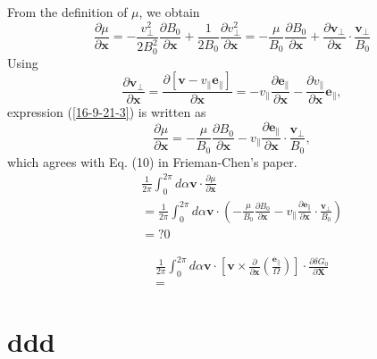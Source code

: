 \documentclass{llncs}
\newcommand{\tmmathbf}[1]{\ensuremath{\boldsymbol{#1}}}
\begin{document}
From the definition of $\mu$, we obtain
\begin{equation}
  \label{16-9-21-3} \frac{\partial \mu}{\partial \mathbf{x}} = -
  \frac{v_{\perp}^2}{2 B^2_0} \frac{\partial B_0}{\partial \mathbf{x}} +
  \frac{1}{2 B_0}  \frac{\partial v_{\perp}^2}{\partial \mathbf{x}} = -
  \frac{\mu}{B_0}  \frac{\partial B_0}{\partial \mathbf{x}} + \frac{\partial
  \mathbf{v}_{\perp}}{\partial \mathbf{x}} \cdot
  \frac{\mathbf{v}_{\perp}}{B_0}
\end{equation}
Using
\begin{equation}
  \frac{\partial \mathbf{v}_{\perp}}{\partial \mathbf{x}} = \frac{\partial
  [\mathbf{v}- v_{\parallel} \mathbf{e}_{\parallel}]}{\partial \mathbf{x}} = -
  v_{\parallel} \frac{\partial \mathbf{e}_{\parallel}}{\partial \mathbf{x}} -
  \frac{\partial v_{\parallel}}{\partial \mathbf{x}} \mathbf{e}_{\parallel},
\end{equation}
expression (\ref{16-9-21-3}) is written as
\begin{equation}
  \frac{\partial \mu}{\partial \mathbf{x}} = - \frac{\mu}{B_0}  \frac{\partial
  B_0}{\partial \mathbf{x}} - v_{\parallel} \frac{\partial
  \mathbf{e}_{\parallel}}{\partial \mathbf{x}} \cdot
  \frac{\mathbf{v}_{\perp}}{B_0},
\end{equation}
which agrees with Eq. (10) in Frieman-Chen's paper{\cite{frieman1982}}.
\begin{eqnarray*}
  &  & \frac{1}{2 \pi} \int_0^{2 \pi} d \alpha \mathbf{v} \cdot
  \frac{\partial \mu}{\partial \mathbf{x}}\\
  &  & = \frac{1}{2 \pi} \int_0^{2 \pi} d \alpha \mathbf{v} \cdot \left( -
  \frac{\mu}{B_0}  \frac{\partial B_0}{\partial \mathbf{x}} - v_{\parallel}
  \frac{\partial \mathbf{e}_{\parallel}}{\partial \mathbf{x}} \cdot
  \frac{\mathbf{v}_{\perp}}{B_0} \right)\\
  &  & = ? 0
\end{eqnarray*}

\begin{eqnarray*}
  &  & \frac{1}{2 \pi} \int_0^{2 \pi} d \alpha \mathbf{v} \cdot \left[
  \mathbf{v} \times \frac{\partial}{\partial \mathbf{x}} \left(
  \frac{\tmmathbf{e}_{\parallel}}{\Omega} \right) \right] \cdot \frac{\partial
  \delta G_0}{\partial \mathbf{X}}\\
  &  & =
\end{eqnarray*}

\section{ddd}
\end{document}
